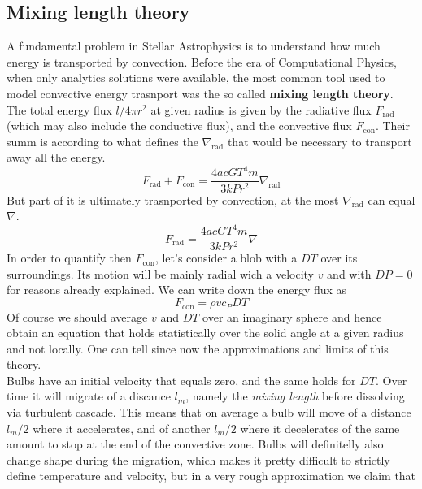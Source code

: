 \documentclass[11pt]{article}
\numberwithin{equation}{section}
\begin{document}
\subsection{Mixing length theory}
A fundamental problem in Stellar Astrophysics is to understand how much energy is transported by convection. Before the era of Computational Physics, when only analytics solutions were available, the most common tool used to model convective energy trasnport was the so called \textbf{mixing length theory}. \\
The total energy flux $l/4 \pi r^2$ at given radius is given by the radiative flux $F_{\mathrm{rad}}$ (which may also include the conductive flux), and the convective flux $F_{\mathrm{con}}$. Their summ is according to \label{nablarad} what defines the $\nabla_{\mathrm{rad}}$ that would be necessary to transport away all the energy.
\begin{equation}\label{7.1}
F_{\mathrm{rad}}+ F_{\mathrm{con}}= \frac{4 a c G T^4 m }{3 k P r^2} \nabla_{\mathrm{rad}}
\end{equation}
But part of it is ultimately trasnported by convection, at the most $\nabla_{\mathrm{rad}}$ can equal $\nabla$. 
\begin{equation}\label{7.2}
F_{\mathrm{rad}}= \frac{4 a c G T^4 m}{3 k P r^2} \nabla
\end{equation}
In order to quantify then $F_{\mathrm{con}}$, let's consider a blob with a $DT$ over its surroundings. Its motion will be mainly radial wich a velocity $v$ and with $DP=0$ for reasons already explained. We can write down the energy flux as
\begin{equation}\label{fconv}
	F_{\mathrm{con}}=\rho  v  c_P  DT
\end{equation}
Of course we should average $v$ and $DT$ over an imaginary sphere and hence obtain an equation that holds statistically over the solid angle at a given radius and not locally. One can tell since now the approximations and limits of this theory. \\
Bulbs have an initial velocity that equals zero, and the same holds for $DT$. Over time it will migrate of a discance $l_m$, namely the \textit{mixing length} before dissolving via turbulent cascade. This means that on average a bulb will move of a distance $l_m/2$ where it accelerates, and of another $l_m/2$ where it decelerates of the same amount to stop at the end of the convective zone. Bulbs will definitelly also change shape during the migration, which makes it pretty difficult to strictly define temperature and velocity, but in a very rough approximation we claim that
\end{document}
